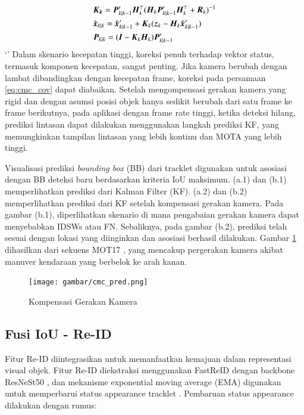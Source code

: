 \begin{equation}
  \begin{aligned}
  & \vb*{K_k} =  {{\vb*{P}}}^{\prime}_{k|k-1} \vb*{H}_k^\top (\vb*{H}_k  {{\vb*{P}}}^{\prime}_{k|k-1} \vb*{H}_k^\top + \vb*{R}_k)^{-1} \\
  & \hat{\vb*{x}}_{k|k} = \hat{\vb*{x}}^\prime_{k|k-1} + \vb*{K}_k (\vb*{z}_k - \vb*{H}_k \hat{\vb*{x}}^\prime_{k|k-1}) \\
  & \vb*{P}_{k|k} = (\vb*{I}- \vb*{K}_k \vb*{H}_k)  {{\vb*{P}}}^{\prime}_{k|k-1}
  \end{aligned}
  \label{eq:cmc_update_kf}
\end{equation} 
`'
Dalam skenario kecepatan tinggi, koreksi penuh terhadap vektor status, termasuk komponen kecepatan, sangat penting. Jika kamera berubah dengan lambat dibandingkan dengan kecepatan frame, koreksi pada persamaan \ref{eq:cmc_cov} dapat diabaikan. Setelah mengompensasi gerakan kamera yang rigid dan dengan asumsi posisi objek hanya sedikit berubah dari satu frame ke frame berikutnya, pada aplikasi dengan frame rate tinggi, ketika deteksi hilang, prediksi lintasan dapat dilakukan menggunakan langkah prediksi KF, yang memungkinkan tampilan lintasan yang lebih kontinu dan MOTA yang lebih tinggi.

Visualisasi prediksi \emph{bounding box} (BB) dari tracklet digunakan untuk asosiasi dengan BB deteksi baru berdasarkan kriteria IoU maksimum. (a.1) dan (b.1) memperlihatkan prediksi dari Kalman Filter (KF). (a.2) dan (b.2) memperlihatkan prediksi dari KF setelah kompensasi gerakan kamera. Pada gambar (b.1), diperlihatkan skenario di mana pengabaian gerakan kamera dapat menyebabkan IDSWs atau FN. Sebaliknya, pada gambar (b.2), prediksi telah sesuai dengan lokasi yang diinginkan dan asosiasi berhasil dilakukan. Gambar \ref{fig:cmc} dihasilkan dari sekuens MOT17 \cite{milan2016mot16}, yang mencakup pergerakan kamera akibat manuver kendaraan yang berbelok ke arah kanan.

\begin{figure}[H]
  \centering
  \texttt{[image: gambar/cmc\_pred.png]}
  \label{fig:cmc}
  \caption{Kompensasi Gerakan Kamera}
\end{figure}

\subsection{Fusi IoU - Re-ID}

Fitur Re-ID diintegrasikan untuk memanfaatkan kemajuan dalam representasi visual objek. Fitur Re-ID diekstraksi menggunakan FastReID dengan backbone ResNeSt50 \parencite{he2020fastreid, zhang2020resnest}, dan mekanisme exponential moving average (EMA) digunakan untuk memperbarui status appearance tracklet \parencite{wang2020towards}. Pembaruan status appearance dilakukan dengan rumus:

